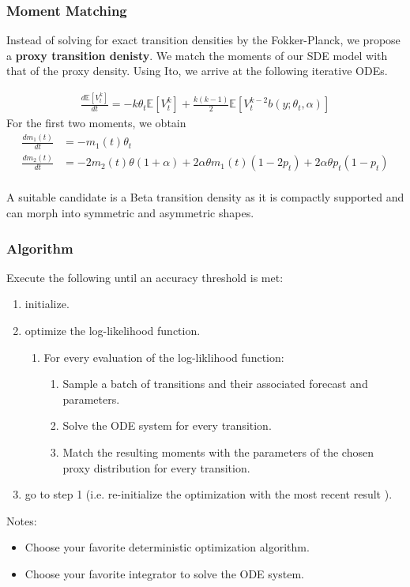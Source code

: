 \documentclass[aspectratio=169]{beamer}\usepackage[utf8]{inputenc}
\newcommand{\E}{\mathbb{E}}
\begin{document}
\begin{frame}\frametitle{Moment Matching}
Instead of solving for exact transition densities by the Fokker-Planck, we propose a \textbf{proxy transition denisty}. We match the moments of our SDE model with that of the proxy density. Using Ito, we arrive at the following iterative ODEs.

\begin{equation}
\begin{split}
\frac{d \E[ V^k_t]}{dt} = - k \theta_t \E [ V^k_t] + \frac{k(k-1)}{2} \E [ V^{k-2}_t  b(y;\theta_t, \alpha)]
\end{split}
\end{equation}
For the first two moments, we obtain
\begin{equation}
\begin{split}
\frac{d m_1 (t)}{dt} &= - m_1(t)\theta_t \\
\frac{d m_2 (t)}{dt} &=  -2 m_2(t)\theta(1+\alpha) + 2\alpha\theta m_1(t)(1-2p_t) + 2 \alpha\theta p_t (1-p_t)\\
\end{split}
\end{equation}

 A suitable candidate is a Beta transition density as it is compactly supported and can morph into symmetric and asymmetric shapes.

\end{frame}

\begin{frame}\frametitle{Algorithm}

Execute the following until an accuracy threshold is met:
\begin{enumerate}
\item initialize.
\item optimize the log-likelihood function.
\begin{enumerate}
\item For every evaluation of the log-liklihood function:
\begin{enumerate}
  \item Sample a batch of transitions and their associated forecast and parameters.
  \item Solve the ODE system for every transition.
  \item Match the resulting moments with the parameters of the chosen proxy distribution for every transition.
\end{enumerate}
\end{enumerate}
\item go to step 1 (i.e. re-initialize the optimization with the most recent result ).
\end{enumerate}

Notes:
\begin{itemize}
\item Choose your favorite deterministic optimization algorithm.
\item Choose your favorite integrator to solve the ODE system.
\end{itemize}
\end{frame}
\end{document}
